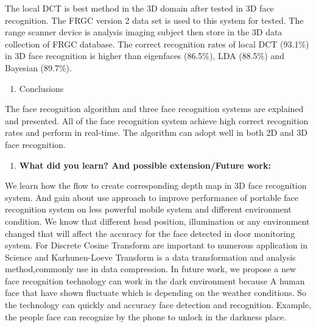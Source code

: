 \documentclass[a4paper,12pt]{article}
\begin{document}
The local DCT is best method in the 3D domain after tested in 3D face recognition.  The FRGC version 2 data set is used to this system for tested. The range scanner device is analysis imaging subject then store in the 3D data collection of FRGC database. The correct recognition rates of local DCT (93.1\%) in 3D face recognition is higher than eigenfaces (86.5\%), LDA (88.5\%) and Bayesian (89.7\%). \\

\maketitle
\begin{enumerate}[{5.}]\bfseries
\item{\normalsize Conclusions}
\end{enumerate}
The face recognition algorithm and three face recognition systems are explained and presented. All of the face recognition system achieve high correct recognition rates and perform in real-time. The algorithm can adopt well in both 2D and 3D face recognition.\\


\maketitle
\begin{enumerate}[{6.}]\bfseries
\item{\normalsize \textbf{What did you learn? And possible extension/Future work:} }
\end{enumerate}
We learn how the flow to create corresponding depth map in 3D face recognition system. And gain about use approach to improve performance of portable face recognition system on less powerful mobile system and different environment condition. We know that different head position, illumination or any environment changed that will affect the accuracy for the face detected in door monitoring system. For Discrete Cosine Transform are important to numerous application in Science and Karhunen-Loeve Transform is a data transformation and analysis method,commonly use in data compression. In future work, we propose a new face recognition technology can work in the dark environment because A human face that have shown fluctuate which is depending on the weather conditions. So the technology can quickly and accuracy face detection and recognition. Example, the people face can recognize by the phone to unlock in the darkness place.\\

{}
\end{document}

